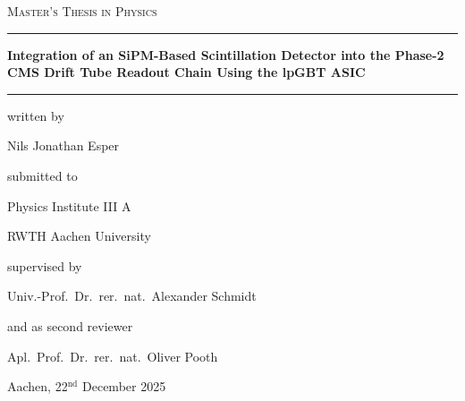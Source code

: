 \centering
\vspace*{1.2cm}
{\LARGE\scshape Master's Thesis in Physics\par}
\vfill
\rule{\textwidth}{0.4pt}\par
\vspace{0.2cm}
{\Huge\bfseries Integration of an SiPM-Based Scintillation Detector into the Phase-2 CMS Drift Tube Readout Chain Using the lpGBT ASIC\par}
\vspace{0.2cm}
\rule{\textwidth}{0.4pt}\par
\vfill
{\large written by\par}
{\LARGE Nils Jonathan Esper\par}
\vspace{1cm}
{\large submitted to\par}
{\LARGE Physics Institute III A\par}
{\LARGE RWTH Aachen University\par}
\vspace{1cm}
{\large supervised by\par}
{\LARGE Univ.-Prof.\ Dr.\ rer.\ nat.\ Alexander Schmidt\par}
\vspace{1cm}
{\large and as second reviewer\par}
{\Large Apl.\ Prof.\ Dr.\ rer.\ nat.\ Oliver Pooth\par}
\vspace{1.5cm}
{\Large Aachen, 22${}^\text{nd}$ December 2025\par}
\vspace{0.5cm}

